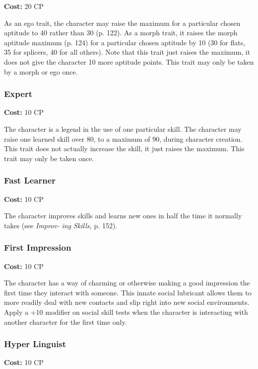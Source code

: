 \textbf{Cost:} 20 CP

As an ego trait, the character may raise the maximum
for a particular chosen aptitude to 40 rather
than 30 (p. 122). As a morph trait, it raises the morph 
aptitude maximum (p. 124) for a particular chosen 
aptitude by 10 (30 for flats, 35 for splicers, 40 for all 
others). Note that this trait just raises the maximum, 
it does not give the character 10 more aptitude points. 
This trait may only be taken by a morph or ego once.

\subsubsection{Expert}

\textbf{Cost:} 10 CP

The character is a legend in the use of one particular 
skill. The character may raise one learned skill over 80, 
to a maximum of 90, during character creation. This 
trait does not actually increase the skill, it just raises 
the maximum. This trait may only be taken once.

\subsubsection{Fast Learner}

\textbf{Cost:} 10 CP

The character improves skills and learns new 
ones in half the time it normally takes (see \textit{Improv-}
\textit{ing Skills, }p. 152).

\subsubsection{First Impression}

\textbf{Cost:} 10 CP

The character has a way of charming or otherwise 
making a good impression the first time they interact 
with someone. This innate social lubricant allows them 
to more readily deal with new contacts and slip right 
into new social environments. Apply a +10 modifier 
on social skill tests when the character is interacting 
with another character for the first time only.

\subsubsection{Hyper Linguist}

\textbf{Cost:} 10 CP

